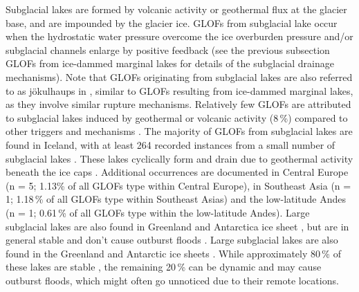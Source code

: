 Subglacial lakes are formed by volcanic activity or geothermal flux at the glacier base, and are impounded by the glacier ice. GLOFs from subglacial lake occur when the hydrostatic water pressure overcome the ice overburden pressure and/or subglacial channels enlarge by positive feedback (see the previous subsection GLOFs from ice-dammed marginal lakes for details of the subglacial drainage mechanisms). Note that GLOFs originating from subglacial lakes are also referred to as jökulhaups in \cite{Bjornsson2010}, similar to GLOFs resulting from ice-dammed marginal lakes, as they involve similar rupture mechanisms. Relatively few GLOFs are attributed to subglacial lakes induced by geothermal or volcanic activity (8\,\%) compared to other triggers and mechanisms \citep{Lutzow&al2023}. The majority of GLOFs from subglacial lakes are found in Iceland, with at least 264 recorded instances from a small number of subglacial lakes \citep{Bjornsson2003}. These lakes cyclically form and drain due to geothermal activity beneath the ice caps \citep{Bjornsson&al2001}. Additional occurrences are documented in Central Europe (n = 5; 1.13\% of all GLOFs type within Central Europe), in
Southeast Asia (n = 1; 1.18\,\% of all GLOFs type within Southeast Asias) and the low-latitude Andes (n = 1; 0.61\,\% of all GLOFs type within the low-latitude Andes). Large subglacial lakes are also found in Greenland and Antarctica ice sheet \citep{Livingstone&al2022}, but are in general stable and don't cause outburst floods \citep{Siegert&al2016,Bowling&al2019}. Large subglacial lakes are also found in the Greenland and Antarctic ice sheets \citep{Siegert&al2016, Bowling&al2019}. While approximately 80\,\% of these lakes are stable \citep{Livingstone&al2022}, the remaining 20\,\% can be dynamic and may cause outburst floods, which might often go unnoticed due to their remote locations.



